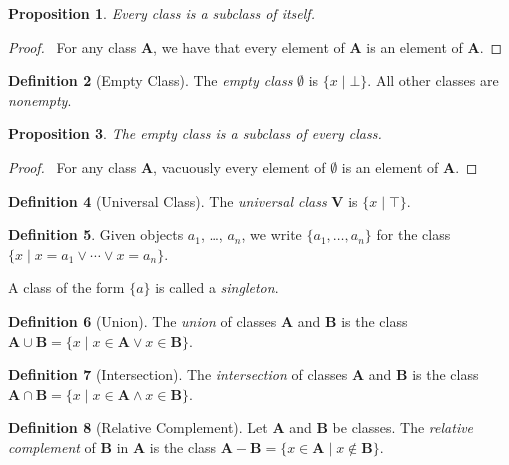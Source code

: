 \documentclass{book}
\let\qed\relax
\newtheorem{prop}{Proposition}[chapter]
\theoremstyle{definition}
\newtheorem{df}[prop]{Definition}
\begin{document}
\begin{prop}
    Every class is a subclass of itself.
\end{prop}

\begin{proof}
    \pf\ For any class $\mathbf{A}$, we have that every element of $\mathbf{A}$ is an element of $\mathbf{A}$. \qed
\end{proof}

\begin{df}[Empty Class]
    The \emph{empty class} $\emptyset$ is $\{ x \mid \bot\}$. All other classes are \emph{nonempty}.
\end{df}

\begin{prop}
    The empty class is a subclass of every class.
\end{prop}

\begin{proof}
    \pf\ For any class $\mathbf{A}$, vacuously every element of $\emptyset$ is an element of $\mathbf{A}$. \qed
\end{proof}

\begin{df}[Universal Class]
    The \emph{universal class} $\mathbf{V}$ is $\{ x \mid \top \}$.
\end{df}

\begin{df}
    Given objects $a_1$, \ldots, $a_n$, we write $\{ a_1, \ldots, a_n \}$ for the class $\{ x \mid x = a_1 \vee \cdots \vee x = a_n \}$.

    A class of the form $\{ a \}$ is called a \emph{singleton}.
\end{df}

\begin{df}[Union]
    The \emph{union} of classes $\mathbf{A}$ and $\mathbf{B}$ is the class $\mathbf{A} \cup \mathbf{B} = \{ x \mid x \in \mathbf{A} \vee x \in \mathbf{B} \}$.
\end{df}

\begin{df}[Intersection]
    The \emph{intersection} of classes $\mathbf{A}$ and $\mathbf{B}$ is the class $\mathbf{A} \cap \mathbf{B} = \{ x \mid x \in \mathbf{A} \wedge x \in \mathbf{B} \}$.
\end{df}

\begin{df}[Relative Complement]
    Let $\mathbf{A}$ and $\mathbf{B}$ be classes. The \emph{relative complement} of $\mathbf{B}$ in $\mathbf{A}$ is the class $\mathbf{A} - \mathbf{B} = \{ x \in \mathbf{A} \mid x \notin \mathbf{B} \}$.
\end{df}
\end{document}
